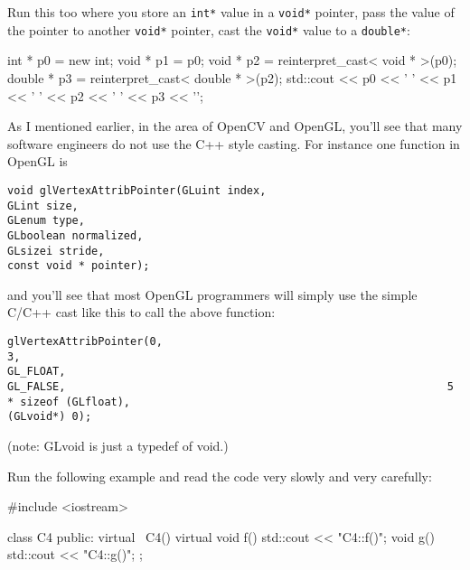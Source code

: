 \begin{consolethree}[escapeinside=||]
Run this too where you store an \texttt{int*} value in a \texttt{void*} pointer, pass the value of the pointer to another \texttt{void*} pointer, cast the \texttt{void*} value to a \texttt{double*}:

\begin{console}
int * p0 = new int;
void * p1 = p0;
void * p2 = reinterpret_cast< void * >(p0);
double * p3 = reinterpret_cast< double * >(p2);
std::cout << p0 << ' ' << p1 << ' ' << p2 << ' '
          << p3 << '\n';
\end{console}

As I mentioned earlier, in the area of OpenCV and OpenGL, you'll see
that many software engineers do not use the C++ style casting. For
instance one function in OpenGL is
\begin{center}
\verb!void glVertexAttribPointer(GLuint index,                                                                   GLint size,                                                                     GLenum type,                                                                    GLboolean normalized,                                                           GLsizei stride,                                                                 const void * pointer);!
\end{center}
and you'll see that most OpenGL programmers will simply use the simple
C/C++ cast like this to call the above function:
\begin{center}
\verb!glVertexAttribPointer(0,                                                                              3,                                                                       GL_FLOAT,                                                                       GL_FALSE,                                                           5 * sizeof (GLfloat),                                                                   (GLvoid*) 0);!
\end{center}

(note: GLvoid is just a typedef of void.)

\newpage{}

Run the following  example and read the code very slowly and very carefully:

\begin{console}
#include <iostream>

class C4
{
public:
     virtual ~C4() {}
     virtual void f() { std::cout << "C4::f()\n"; }
     void g() { std::cout << "C4::g()\n"; }
};


\end{console}
\end{consolethree}
